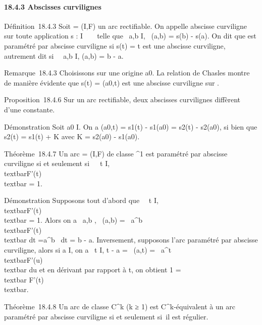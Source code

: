\paragraph{18.4.3 Abscisses curvilignes}

Définition~18.4.3 Soit \Gamma = (I,F) un arc rectifiable. On appelle abscisse
curviligne sur \Gamma toute application s : I \rightarrow~ ~ telle que
\forall~a,b \in I, \ell\Gamma~(a,b) = s(b) - s(a). On
dit que \Gamma est paramétré par abscisse curviligne si s(t) = t est une
abscisse curviligne, autrement dit si \forall~~a,b \in
I, \ell\Gamma(a,b) = b - a.

Remarque~18.4.3 Choisissons sur \Gamma une origine a0. La relation
de Chasles montre de manière évidente que s(t) =
\ell\Gamma(a0,t) est une abscisse curviligne sur \Gamma.

Proposition~18.4.6 Sur un arc rectifiable, deux abscisses curvilignes
diffèrent d'une constante.

Démonstration Soit a0 \in I. On a \ell\Gamma(a0,t) =
s1(t) - s1(a0) = s2(t) -
s2(a0), si bien que s2(t) =
s1(t) + K avec K = s2(a0) -
s1(a0).

Théorème~18.4.7 Un arc \Gamma = (I,F) de classe ^1 est paramétré
par abscisse curviligne si et seulement si~\forall~~t
\in I, \\textbar{}F'(t)\\textbar{} = 1.

Démonstration Supposons tout d'abord que \forall~~t \in
I, \\textbar{}F'(t)\\textbar{} = 1. Alors
on a \forall~a,b \in \Gamma, \ell\Gamma~(a,b)
=\int ~
a^b\\textbar{}F'(t)\\textbar{}
dt =\int  a^b~ dt = b - a.
Inversement, supposons l'arc paramétré par abscisse curviligne, alors si
a \in I, on a \forall~t \in I, t - a = \ell\Gamma~(a,t)
=\int ~
a^t\\textbar{}F'(u)\\textbar{}
du et en dérivant par rapport à t, on obtient 1
=\\textbar{} F'(t)\\textbar{}.

Théorème~18.4.8 Un arc de classe C^k (k ≥ 1) est
C^k-équivalent à un arc paramétré par abscisse curviligne si
et seulement si~il est régulier.

